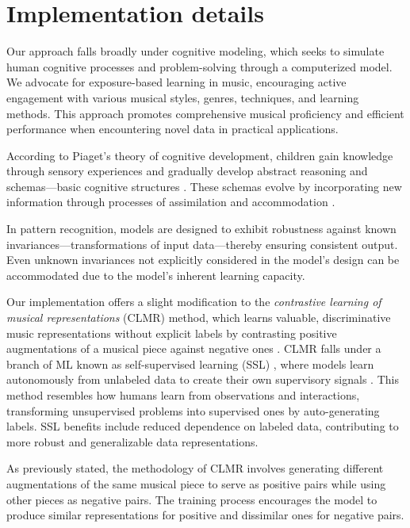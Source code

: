 \section{Implementation details}

Our approach falls broadly under cognitive modeling, which seeks to simulate human cognitive processes and problem-solving through a computerized model. We advocate for exposure-based learning in music, encouraging active engagement with various musical styles, genres, techniques, and learning methods. This approach promotes comprehensive musical proficiency and efficient performance when encountering novel data in practical applications.

According to Piaget's theory of cognitive development, children gain knowledge through sensory experiences and gradually develop abstract reasoning and schemas—basic cognitive structures \cite{Huitt2003PiagetsDevelopment}. These schemas evolve by incorporating new information through processes of assimilation and accommodation \cite{audioselfsupsurvey}.

In pattern recognition, models are designed to exhibit robustness against known invariances—transformations of input data—thereby ensuring consistent output. Even unknown invariances not explicitly considered in the model's design can be accommodated due to the model's inherent learning capacity.

Our implementation offers a slight modification to the \textit{contrastive learning of musical representations} (CLMR) method, which learns valuable, discriminative music representations without explicit labels by contrasting positive augmentations of a musical piece against negative ones \cite{CLMR2021}. CLMR falls under a branch of ML known as self-supervised learning (SSL) \cite{Balestriero2023ALearning}, where models learn autonomously from unlabeled data to create their own supervisory signals \cite{audioselfsupsurvey}. This method resembles how humans learn from observations and interactions, transforming unsupervised problems into supervised ones by auto-generating labels. SSL benefits include reduced dependence on labeled data, contributing to more robust and generalizable data representations.

As previously stated, the methodology of CLMR involves generating different augmentations of the same musical piece to serve as positive pairs while using other pieces as negative pairs. The training process encourages the model to produce similar representations for positive and dissimilar ones for negative pairs.

